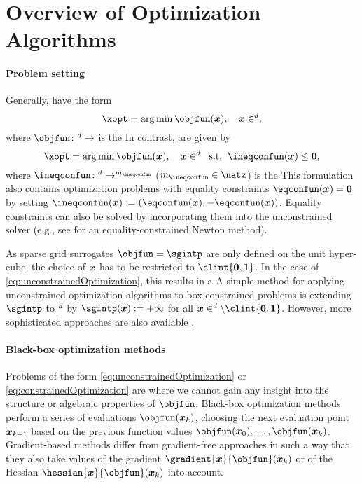 \section{Overview of Optimization Algorithms}
\label{sec:51algorithms}

\paragraph{Problem setting}

Generally,  have the form
\begin{equation}
  \label{eq:unconstrainedOptimization}
  \xopt = \argmin \objfun(\*x),\quad
  \*x \in \real^d,
\end{equation}
where $\objfun\colon \real^d \to \real$ is the 
In contrast,  are given by
\begin{equation}
  \label{eq:constrainedOptimization}
  \xopt = \argmin \objfun(\*x),\quad
  \*x \in \real^d\;\;\text{s.t.}\;\;
  \ineqconfun(\*x) \le \*0,
\end{equation}
where
$\ineqconfun\colon \real^d \to \real^{m_{\ineqconfun}}$
($m_{\ineqconfun} \in \natz$)
is the 
This formulation also contains optimization problems
with equality constraints $\eqconfun(\*x) = \*0$
by setting $\ineqconfun(\*x) := (\eqconfun(\*x), -\eqconfun(\*x))$.
Equality constraints can also be solved by incorporating them
into the unconstrained solver (e.g., see \cite{Boyd04Convex}
for an equality-constrained Newton method).

As sparse grid surrogates $\objfun = \sgintp$ are only defined on the
unit hyper-cube,
the choice of ${\boldsymbol{x}}$ has to be restricted to $\clint{\*0, \*1}$.
In the case of \eqref{eq:unconstrainedOptimization},
this results in a 
A simple method for applying unconstrained optimization algorithms
to box-constrained problems is extending $\sgintp$ to $\real^d$ by
$\sgintp(\*x) := +\infty$ for all $\*x \in \real^d \setminus \clint{\*0, \*1}$.
However, more sophisticated
approaches are also available \cite{More87Optimization}.

\paragraph{Black-box optimization methods}

Problems of the form \eqref{eq:unconstrainedOptimization} or
\eqref{eq:constrainedOptimization} are 
where we cannot gain any insight into the structure or algebraic
properties of $\objfun$.
Black-box optimization methods perform a series of evaluations
$\objfun(\*x_k)$,
choosing the next evaluation point ${\boldsymbol{x}}_{k+1}$
based on the previous function values $\objfun(\*x_0), \dotsc, \objfun(\*x_k)$.
Gradient-based methods differ from gradient-free approaches
in such a way that they also take values of the gradient
$\gradient{\*x}{\objfun}(\*x_k)$ or of the Hessian
$\hessian{\*x}{\objfun}(\*x_k)$ into account.

